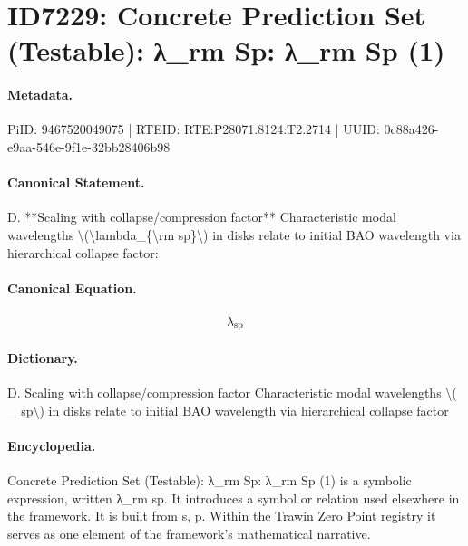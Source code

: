 \section*{ID7229: Concrete Prediction Set (Testable): λ\_rm Sp: λ\_rm Sp (1)}
\paragraph{Metadata.}
PiID: 9467520049075 | RTEID: RTE:P28071.8124:T2.2714 | UUID: 0c88a426-e9aa-546e-9f1e-32bb28406b98

\paragraph{Canonical Statement.}
D. **Scaling with collapse/compression factor** Characteristic modal wavelengths \textbackslash{}(\textbackslash{}lambda\_\{\textbackslash{}rm sp\}\textbackslash{}) in disks relate to initial BAO wavelength via hierarchical collapse factor:

\paragraph{Canonical Equation.}
\[
\lambda_{\rm sp}
\]

\paragraph{Dictionary.}
D. Scaling with collapse/compression factor Characteristic modal wavelengths \textbackslash{}( \_ sp\textbackslash{}) in disks relate to initial BAO wavelength via hierarchical collapse factor

\paragraph{Encyclopedia.}
Concrete Prediction Set (Testable): λ\_rm Sp: λ\_rm Sp (1) is a symbolic expression, written λ\_rm sp. It introduces a symbol or relation used elsewhere in the framework. It is built from s, p. Within the Trawin Zero Point registry it serves as one element of the framework's mathematical narrative.
